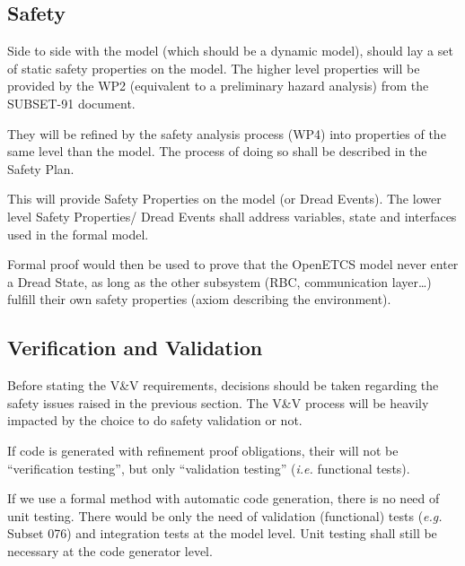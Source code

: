 \documentclass{template/openetcs_article}
\begin{document}
\subsection{Safety}
\label{safety}
\begin{justif}
Side to side with the model (which should be a dynamic model), should lay a set of  
static safety properties on the model. The higher level properties will be provided 
by the WP2 (equivalent to a preliminary hazard analysis) from the SUBSET-91 document.

They will be refined by the safety analysis process (WP4) into properties of the same 
level than the model. The process of doing so shall be described in the Safety Plan.

This will provide Safety Properties on the model (or Dread Events). The lower level Safety Properties/
Dread Events shall address variables, state and interfaces used in the formal model.

Formal proof would then be used to prove that the OpenETCS model never enter a Dread State, 
as long as the other subsystem (RBC, communication layer\dots) fulfill their own safety properties
(axiom describing the environment).
\end{justif}


\tbc


\subsection{Verification and Validation}



\begin{issue}Before stating the V\&V requirements, decisions should be taken regarding 
the safety issues raised in the previous section. The V\&V process will be heavily impacted
by the choice to do safety validation or not. 

If code is generated with refinement proof obligations, 
their will not be “verification testing”, but only “validation testing” 
(\emph{i.e.} functional tests).

If we use a formal method with automatic code generation, there is no need of unit testing. 
There would be only the need of validation (functional) tests (\emph{e.g.} Subset 076) and 
integration tests at the model level. Unit testing shall still be necessary at the code generator level.

\\

\end{issue}
\end{document}
